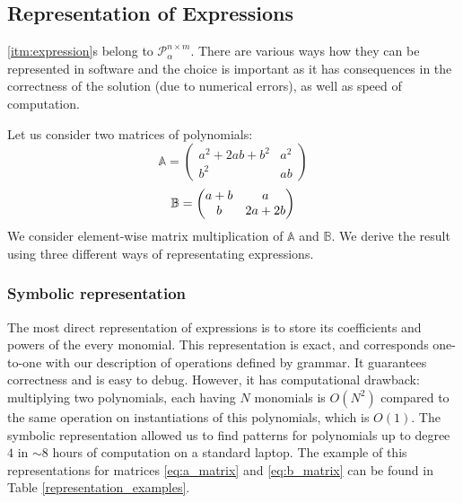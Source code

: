 \subsection{Representation of Expressions} \label{representation}
\ref{itm:expression}s belong to $\mathcal{P}^{n \times m}_\alpha$. There are various
ways how they can be represented in software and the choice is
important as it has consequences in the correctness of the solution
(due to numerical errors), as well as speed of computation.

Let us consider two matrices of polynomials:
\begin{equation}
\label{eq:a_matrix}
\mathbb{A} = \begin{pmatrix} a^2 + 2ab + b^2 & a^2\\ b^2 & ab \end{pmatrix} 
\end{equation}
\begin{equation}
\label{eq:b_matrix}
\mathbb{B} = \begin{pmatrix} a + b & a\\ b & 2a + 2b \end{pmatrix} \vspace{-1mm}
\vspace{-1mm}
\end{equation}
We consider element-wise matrix multiplication of $\mathbb{A}$ and
$\mathbb{B}$. We derive the result using three different ways of
representating expressions.



\subsubsection{Symbolic representation}
The most direct representation of expressions is to store its coefficients and powers of the every monomial.
This representation is exact, and corresponds one-to-one with our description of operations
defined by grammar. It guarantees correctness and is easy to debug. 
However, it has computational drawback: multiplying two polynomials, each having $N$ monomials is $O(N^2)$ compared to the same operation on instantiations of this polynomials, which is $O(1)$.
The symbolic representation allowed us
to find patterns for polynomials up to degree $4$ in $\sim 8$ hours of computation on a standard laptop. 
The example of this representations for matrices \ref{eq:a_matrix} and \ref{eq:b_matrix} can be found
in Table \ref{representation_examples}.

